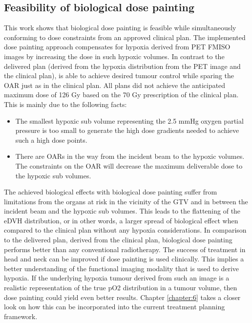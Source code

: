 \subsection{Feasibility of biological dose painting}
This work shows that biological dose painting is feasible while simultaneously conforming to dose constraints from an approved clinical plan. The implemented dose painting approach compensates for hypoxia derived from PET FMISO images by increasing the dose in such hypoxic volumes. In contrast to the delivered plan (derived from the hypoxia distribution from the PET image and the clinical plan), is able to achieve desired tumour control while sparing the OAR just as in the clinical plan. All plans did not achieve the anticipated maximum dose of 126 Gy based on the 70 Gy prescription of the clinical plan. This is mainly due to the following facts:
\begin{itemize}
\item The smallest hypoxic sub volume representing the 2.5 mmHg oxygen partial pressure is too small to generate the high dose gradients needed to achieve such a high dose points.
\item There are OARs in the way from the incident beam to the hypoxic volumes. The constraints on the OAR will decrease the maximum deliverable dose to the hypoxic sub volumes.
\end{itemize} 
The achieved biological effects with biological dose painting suffer from limitations from the organs at risk in the vicinity of the GTV and in between the incident beam and the hypoxic sub volumes. This leads to the flattening of the eDVH distribution, or in other words, a larger spread of biological effect when compared to the clinical plan without any hypoxia considerations. In comparison to the delivered plan, derived from the clinical plan, biological dose painting performs better than any conventional radiotherapy. The success of treatment in head and neck can be improved if dose painting is used clinically. This implies a better understanding of the functional imaging modality that is used to derive hypoxia. If the underlying hypoxia tumour derived from such an image is a realistic representation of the true pO2 distribution in a tumour volume, then dose painting could yield even better results. Chapter \ref{chapter:6} takes a closer look on how this can be incorporated into the current treatment planning framework.
